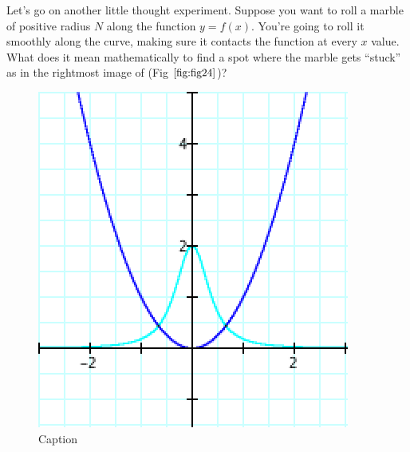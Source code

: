 Let’s go on another little thought experiment. Suppose you want to roll a marble of positive radius $N$ along the function $y = f(x)$. You’re going to roll it smoothly along the curve, making sure it contacts the function at every $x$ value. What does it mean mathematically to find a spot where the marble gets ``stuck'' as in the rightmost image of (Fig $\ref{fig:fig24}$)? 

\begin{figure}[h!]
  \begin{minipage}[b]{0.5\linewidth}
    \centering
    \includegraphics[width=.9\linewidth, height=0.2\textheight, keepaspectratio]{findig-crunch-spots-img/Fig 21.png}
    \caption{Caption}
    \label{fig:fig21}
  \end{minipage} %
  \begin{minipage}[b]{0.5\linewidth}
    \centering

\end{minipage}
\end{figure}
